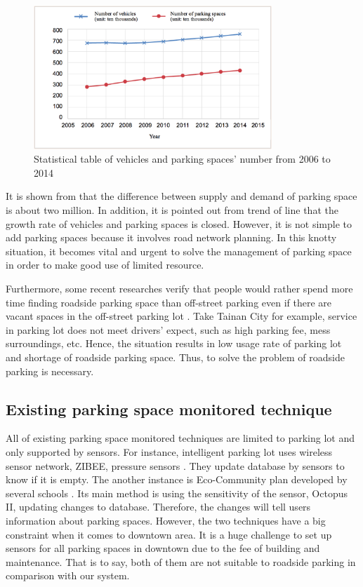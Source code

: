 \documentclass[preprint,12pt]{elsarticle}
\begin{document}
\begin{figure}[tbp]
\begin{center}
\includegraphics[width=0.8\textwidth]{Figures/Statistical_Table.png}
\end{center}
\caption{Statistical table of vehicles and parking spaces' number from
2006 to 2014}
\label{fig:StatisticalTable}
\end{figure}

It is shown from  that the difference between supply and demand
of parking space is about two million. In addition, it is pointed out
from trend of line that the growth rate of vehicles and parking spaces
is closed. However, it is not simple to add parking spaces because it
involves road network planning. In this knotty situation, it becomes
vital and urgent to solve the management of parking space in order to
make good use of limited resource.

Furthermore, some recent researches verify that people would rather
spend more time finding roadside parking space than off-street parking
even if there are vacant spaces in the off-street parking lot \cite{OnStreetParking}. Take
Tainan City for example, service in parking lot does not meet drivers'
expect, such as high parking fee, mess surroundings, etc. Hence, the
situation results in low usage rate of parking lot and shortage of
roadside parking space. Thus, to solve the problem of roadside parking
is necessary.

%
\subsection{Existing parking space monitored technique}
%

All of existing parking space monitored techniques are limited to
parking lot and only supported by sensors. For instance, intelligent
parking lot uses wireless sensor network, ZIBEE, pressure sensors
\cite{PaymentSystem, IOV2015}.
They update database by sensors to know if it is empty. The another
instance is Eco-Community plan developed by several schools
\cite{EcoCommunity}. Its
main method is using the sensitivity of the sensor, Octopus II,
updating changes to database. Therefore, the changes will tell users
information about parking spaces. However, the two techniques have a big
constraint when it comes to downtown area. It is a huge challenge to set
up sensors for all parking spaces in downtown due to the fee of building
and maintenance. That is to say, both of them are not suitable to
roadside parking in comparison with our system.
\end{document}
